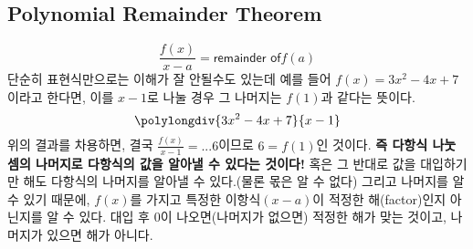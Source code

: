 \documentclass{article}
\begin{document}
\subsection{Polynomial Remainder Theorem}
$$\frac{f(x)}{x-a}={\textsf{remainder of}} f(a)$$
단순히 표현식만으로는 이해가 잘 안될수도 있는데 예를 들어 $f(x) = 3x^{2}-4x+7$이라고 한다면, 이를 $x-1$로 나눌 경우 그 나머지는 $f(1)$과 같다는 뜻이다.
$$\polylongdiv{3x^{2}-4x+7}{x-1}$$
위의 결과를 차용하면, 결국 $\frac{f(x)}{x-1}=...6$이므로 $6=f(1)$인 것이다. \textbf{즉 다항식 나눗셈의 나머지로 다항식의 값을 알아낼 수 있다는 것이다!} 혹은 그 반대로 값을 대입하기만 해도 다항식의 나머지를 알아낼 수 있다.(물론 몫은 알 수 없다) 그리고 나머지를 알 수 있기 때문에, $f(x)$를 가지고 특정한 이항식$(x-a)$이 적정한 해(factor)인지 아닌지를 알 수 있다. 대입 후 0이 나오면(나머지가 없으면) 적정한 해가 맞는 것이고, 나머지가 있으면 해가 아니다.
\end{document}

